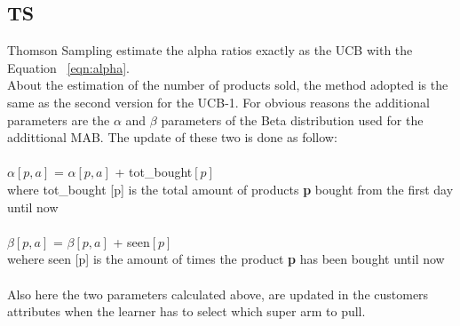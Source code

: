 \subsection{TS}
Thomson Sampling estimate the alpha ratios exactly as the UCB with the Equation ~\ref{eqn:alpha}.\\About the estimation of the number of products sold, the method adopted is the same as the second version for the UCB-1. For obvious reasons the additional parameters are the $\alpha$ and $\beta$ parameters of the Beta distribution used for the addittional MAB. The update of these two is done as follow:\\\\
$\alpha[p, a]$ = $\alpha[p, a]$ + tot\_bought$[p]$\\
where tot\_bought [p] is the total amount of products {\bf p} bought from the first day until now\\\\
$\beta[p, a]$ = $\beta [p, a]$ + seen$[p]$\\
wehere seen [p] is the amount of times the product {\bf p} has been bought until now\\\\
Also here the two parameters calculated above, are updated in the customers attributes when the learner has to select which super arm to pull.

